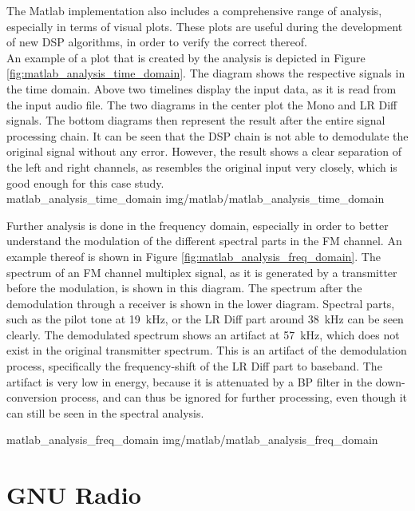 The Matlab implementation also includes a comprehensive range of analysis, especially in terms of visual plots.
These plots are useful during the development of new DSP algorithms, in order to verify the correct thereof.\\

An example of a plot that is created by the analysis is depicted in Figure \ref{fig:matlab_analysis_time_domain}.
The diagram shows the respective signals in the time domain.
Above two timelines display the input data, as it is read from the input audio file.
The two diagrams in the center plot the Mono and LR Diff signals.
The bottom diagrams then represent the result after the entire signal processing chain.
It can be seen that the DSP chain is not able to demodulate the original signal without any error.
However, the result shows a clear separation of the left and right channels, as resembles the original input very closely, which is good enough for this case study.\\

 {matlab_analysis_time_domain} {img/matlab/matlab_analysis_time_domain}

Further analysis is done in the frequency domain, especially in order to better understand the modulation of the different spectral parts in the FM channel.
An example thereof is shown in Figure \ref{fig:matlab_analysis_freq_domain}.
The spectrum of an FM channel multiplex signal, as it is generated by a transmitter before the modulation, is shown in this diagram.
The spectrum after the demodulation through a receiver is shown in the lower diagram.
Spectral parts, such as the pilot tone at 19~kHz, or the LR Diff part around 38~kHz can be seen clearly.
The demodulated spectrum shows an artifact at 57~kHz, which does not exist in the original transmitter spectrum.
This is an artifact of the demodulation process, specifically the frequency-shift of the LR Diff part to baseband.
The artifact is very low in energy, because it is attenuated by a BP filter in the down-conversion process, and can thus be ignored for further processing, even though it can still be seen in the spectral analysis.

 {matlab_analysis_freq_domain} {img/matlab/matlab_analysis_freq_domain}

\section{GNU Radio}

